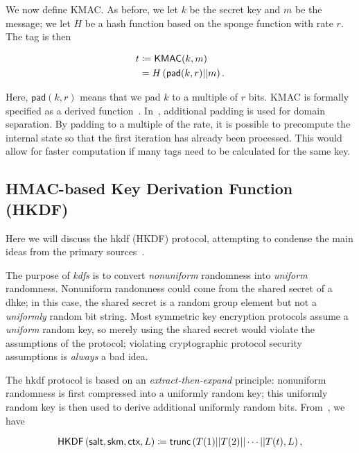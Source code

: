 We now define KMAC.
As before, we let $k$ be the secret key and $m$ be the message;
we let $H$ be a \gls{hash function} based on the \Keccak{} sponge function
with rate $r$.
The tag is then

\begin{align}
    t &\coloneqq{} \textsf{KMAC}(k,m) \nonumber\\
        &= H\left( \textsf{pad}(k,r)||m \right).
\end{align}

\noindent
Here, $\textsf{pad}(k,r)$ means that we pad $k$ to a multiple of $r$ bits.
KMAC is formally specified as a derived \ShaThree{}
function~\cite{NIST-SP-800-185}.
In~\cite{NIST-SP-800-185},
additional padding is used for domain separation.
By padding to a multiple of the rate, it is possible to precompute
the internal state so that the first iteration has already been processed.
This would allow for faster computation
if many tags need to be calculated for the same key.


\subsection{HMAC-based Key Derivation Function (HKDF)}
\label{app:crypto_hkdf}

Here we will discuss the \gls{hkdf} (HKDF) protocol,
attempting to condense the main ideas from
the primary sources~\cite{HKDF2010,rfc5869}.

The purpose of \emph{\glspl{kdf}}
is to convert \emph{nonuniform} randomness into \emph{uniform} randomness.
Nonuniform randomness could come from the \gls{shared secret}
of a \gls{dhke};
in this case, the \gls{shared secret} is a random group element
but not a \emph{uniformly} random bit string.
Most \gls{symmetric key encryption} protocols assume a
\emph{uniform} random key,
so merely using the \gls{shared secret} would violate the assumptions
of the protocol;
violating cryptographic protocol security assumptions is
\emph{always} a bad idea.

The \gls{hkdf} protocol is based on an
\emph{extract-then-expand} principle:
nonuniform randomness is first compressed into a uniformly random key;
this uniformly random key is then used to derive additional
uniformly random bits.
From~\cite{HKDF2010}, we have

\begin{equation}
    \textsf{HKDF}\left( \textsf{salt}, \textsf{skm}, \textsf{ctx}, L \right)
        \coloneqq{} \textsf{trunc}\left( T(1) || T(2) || \cdots || T(t), L \right),
\end{equation}

